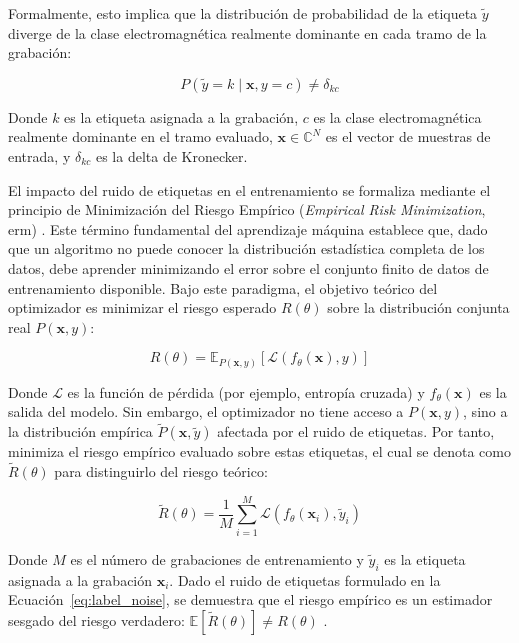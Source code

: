 Formalmente, esto implica que la distribución de probabilidad de la etiqueta $\tilde{y}$ diverge de la clase electromagnética realmente dominante en cada tramo de la grabación:

\begin{equation}
    P(\tilde{y} = k \mid \mathbf{x}, y = c) \neq \delta_{kc}
    \label{eq:label_noise}
\end{equation}

Donde $k$ es la etiqueta asignada a la grabación, $c$ es la clase electromagnética realmente dominante en el tramo evaluado, $\mathbf{x} \in \mathbb{C}^N$ es el vector de muestras de entrada, y $\delta_{kc}$ es la delta de Kronecker.

El impacto del ruido de etiquetas en el entrenamiento se formaliza mediante el principio de Minimización del Riesgo Empírico (\textit{Empirical Risk Minimization}, \gls{erm}) \cite{vapnik_nature_1998}. Este término fundamental del aprendizaje máquina establece que, dado que un algoritmo no puede conocer la distribución estadística completa de los datos, debe aprender minimizando el error sobre el conjunto finito de datos de entrenamiento disponible. Bajo este paradigma, el objetivo teórico del optimizador es minimizar el riesgo esperado $R(\theta)$ sobre la distribución conjunta real $P(\mathbf{x}, y)$:

\begin{equation}
    R(\theta) = \mathbb{E}_{P(\mathbf{x}, y)} \left[ \mathcal{L}(f_\theta(\mathbf{x}), y) \right]
    \label{eq:riesgo_teorico}
\end{equation}

Donde $\mathcal{L}$ es la función de pérdida (por ejemplo, entropía cruzada) y $f_\theta(\mathbf{x})$ es la salida del modelo. Sin embargo, el optimizador no tiene acceso a $P(\mathbf{x}, y)$, sino a la distribución empírica $\tilde{P}(\mathbf{x}, \tilde{y})$ afectada por el ruido de etiquetas. Por tanto, minimiza el riesgo empírico evaluado sobre estas etiquetas, el cual se denota como $\tilde{R}(\theta)$ para distinguirlo del riesgo teórico:

\begin{equation}
    \tilde{R}(\theta) = \frac{1}{M} \sum_{i=1}^{M} \mathcal{L}(f_\theta(\mathbf{x}_i), \tilde{y}_i)
    \label{eq:riesgo_empirico}
\end{equation}

Donde $M$ es el número de grabaciones de entrenamiento y $\tilde{y}_i$ es la etiqueta asignada a la grabación $\mathbf{x}_i$. Dado el ruido de etiquetas formulado en la Ecuación~\ref{eq:label_noise}, se demuestra que el riesgo empírico es un estimador sesgado del riesgo verdadero: $\mathbb{E}[\tilde{R}(\theta)] \neq R(\theta)$ \cite{natarajan_learning_2013, song_learning_2022}.

